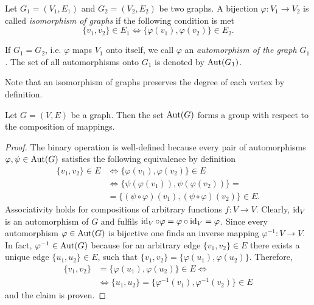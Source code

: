 \begin{defin}
\begin{thmlist}
\item Let $G_1=(V_1,E_1)$ and $G_2=(V_2,E_2)$ be two graphs. A bijection $\varphi\colon V_1 \to V_2$ is called \emph{isomorphism of graphs} if the following condition is met
\begin{equation*}
\lbrace v_1,v_2\rbrace\in E_1 \Leftrightarrow \lbrace \varphi(v_1),\varphi(v_2)\rbrace\in E_2.
\end{equation*}
\item If $G_1=G_2$, i.e. $\varphi$ maps $V_1$ onto itself, we call $\varphi$ an \emph{automorphism of the graph $G_1$.} The set of all automorphisms onto $G_1$ is denoted by $\operatorname{Aut}(G_1)$.
\end{thmlist}
\end{defin}
\begin{rem}
Note that an isomorphism of graphs preserves the degree of each vertex by definition.
\end{rem}
\begin{thm}\label{thm:Graph-Automorphisms Form a Group}
Let $G=(V,E)$ be a graph. Then the set $\operatorname{Aut}(G)$ forms a group with respect to the composition of mappings.
\end{thm}
\begin{proof}
The binary operation is well-defined because every pair of automorphisms $\varphi,\psi\in\operatorname{Aut}(G)$ satisfies the following equivalence by definition
\begin{align*}
\lbrace v_1,v_2\rbrace\in E&\Leftrightarrow\lbrace \varphi(v_1),\varphi(v_2)\rbrace\in E\\
&\Leftrightarrow\lbrace \psi(\varphi(v_1)),\psi(\varphi(v_2))\rbrace=\\
&=\lbrace (\psi\circ\varphi)(v_1),(\psi\circ\varphi)(v_2)\rbrace\in E.
\end{align*}
Associativity holds for compositions of arbitrary functions $f\colon V\to V$. Clearly, $\operatorname{id}_V$ is an automorphism of $G$ and fulfils $\operatorname{id}_V\circ\varphi=\varphi\circ\operatorname{id}_V=\varphi$. Since every automorphism $\varphi\in\operatorname{Aut}(G)$ is bijective one finds an inverse mapping $\varphi^{-1}\colon V\to V$. In fact, $\varphi^{-1}\in\operatorname{Aut}(G)$ because for an arbitrary edge $\lbrace v_1,v_2\rbrace\in E$ there exists a unique edge $\lbrace u_1,u_2\rbrace\in E$, such that $\lbrace v_1,v_2\rbrace=\lbrace \varphi(u_1),\varphi(u_2)\rbrace$. Therefore,
\begin{align*}
\lbrace v_1,v_2\rbrace&=\lbrace \varphi(u_1),\varphi(u_2)\rbrace\in E\Leftrightarrow\\
&\Leftrightarrow \lbrace u_1,u_2\rbrace=\lbrace \varphi^{-1}(v_1),\varphi^{-1}(v_2)\rbrace\in E
\end{align*}
and the claim is proven.
\end{proof}